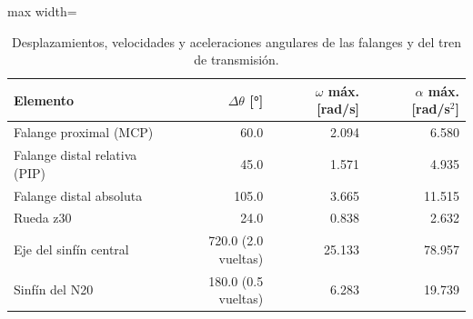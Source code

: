 \begin{table}[H]
\centering

\begin{adjustbox}{max width=\textwidth}
\begin{tabular}{|l|r|r|r|}
\hline
\textbf{Elemento} & \textbf{$\Delta\theta$ [°]} & \textbf{$\omega$ máx. [rad/s]} & \textbf{$\alpha$ máx. [rad/s$^2$]} \\ \hline
Falange proximal (MCP) & 60.0 & 2.094 & 6.580 \\ \hline
Falange distal relativa (PIP) & 45.0 & 1.571 & 4.935 \\ \hline
Falange distal absoluta & 105.0 & 3.665 & 11.515 \\ \hline
Rueda z30 & 24.0 & 0.838 & 2.632 \\ \hline
Eje del sinfín central & 720.0 (2.0 vueltas) & 25.133 & 78.957 \\ \hline
Sinfín del N20 & 180.0 (0.5 vueltas) & 6.283 & 19.739 \\ \hline
\end{tabular}
\end{adjustbox}
\caption{Desplazamientos, velocidades y aceleraciones angulares de las falanges y del tren de transmisión.}
\label{tab:desplazang}
\end{table}